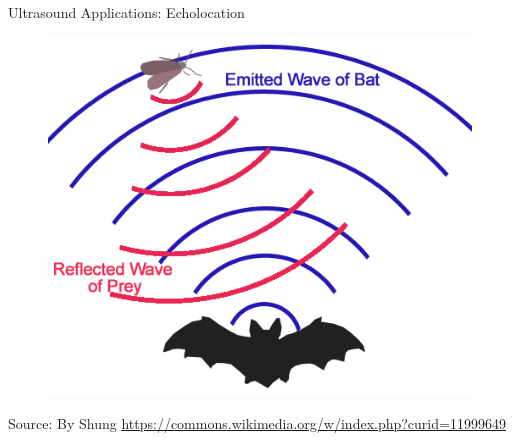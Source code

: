 \begin{frame}{Ultrasound Applications: Echolocation}
    \begin{figure}
        \centering
        \includegraphics[height=0.7\textheight]{images/Bat_echolocation.jpg}\\
    \end{figure}
    \begin{flushright}
        \tiny
        Source: By Shung \url{https://commons.wikimedia.org/w/index.php?curid=11999649}
    \end{flushright}
\end{frame}



